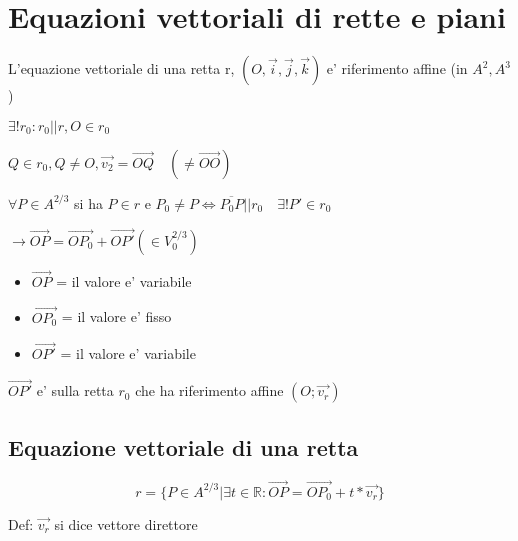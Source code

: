 \documentclass{article}
\begin{document}
\section{Equazioni vettoriali di rette e piani}
\begin{flushleft}
	L'equazione vettoriale di una retta r,
	$(O,\overrightarrow{i},\overrightarrow{j},\overrightarrow{k})$ e' riferimento affine (in $A^2,A^3$)
\end{flushleft}
\begin{flushleft}
	$\exists ! r_0 : r_0 || r, O \in r_0$
\end{flushleft}
\begin{flushleft}
	$ Q \in r_0, Q \neq O, \overrightarrow{v_2}=\overrightarrow{OQ} \quad (\neq \overrightarrow{OO})$
\end{flushleft}
\begin{flushleft}
	$\forall P \in A^{2/3}$ si ha $ P \in r$ e $P_0 \neq P \iff \overline{P_0 P} || r_0 \quad \exists ! P' \in r_0$
\end{flushleft}
\begin{flushleft}
	$\to \overrightarrow{OP} = \overrightarrow{OP_0} + \overrightarrow{OP'} (\in V_0^{2/3})$
\end{flushleft}
\begin{itemize}
	\item $\overrightarrow{OP}$ = il valore e' variabile
	\item $\overrightarrow{OP_0}$ = il valore e' fisso
	\item $\overrightarrow{OP'}$ = il valore e' variabile
\end{itemize}
\begin{flushleft}
	$\overrightarrow{OP'}$ e' sulla retta $r_0$ che ha riferimento affine $(O;\overrightarrow{v_r})$
\end{flushleft}
\subsection*{Equazione vettoriale di una retta}
\begin{equation*}
	r = \{ P \in A^{2/3} | \exists t \in \mathbb{R}: \overrightarrow{OP}=\overrightarrow{OP_0}+t*\overrightarrow{v_r} \}
\end{equation*}
\begin{flushleft}
	Def:  $\overrightarrow{v_r}$ si dice vettore direttore
\end{flushleft}
\end{document}
